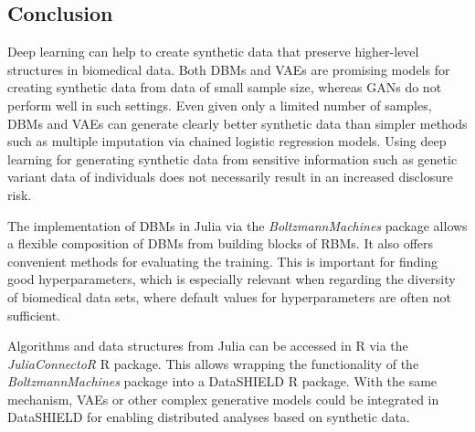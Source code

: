 \documentclass[12pt]{article}
\newcommand{\apkg}[1]{\emph{#1}}
\begin{document}
\subsection{Conclusion}
Deep learning can help to create synthetic data that preserve higher-level structures in biomedical data.
Both DBMs and VAEs are promising models for creating synthetic data from data of small sample size, whereas GANs do not perform well in such settings.
Even given only a limited number of samples, DBMs and VAEs can generate clearly better synthetic data than simpler methods such as multiple imputation via chained logistic regression models.
Using deep learning for generating synthetic data from sensitive information such as genetic variant data of individuals does not necessarily result in an increased disclosure risk.

The implementation of DBMs in Julia via the \apkg{BoltzmannMachines} package allows a flexible composition of DBMs from building blocks of RBMs.
It also offers convenient methods for evaluating the training.
This is important for finding good hyperparameters, which is especially relevant when regarding the diversity of biomedical data sets, where default values for hyperparameters are often not sufficient.

Algorithms and data structures from Julia can be accessed in R via the \apkg{JuliaConnectoR} R package.
This allows wrapping the functionality of the \apkg{BoltzmannMachines} package into a DataSHIELD R package.
With the same mechanism, VAEs or other complex generative models could be integrated in DataSHIELD for enabling distributed analyses based on synthetic data.

\clearpage
\appendix
\end{document}
